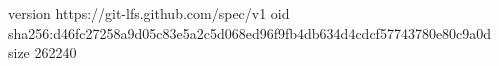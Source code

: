 version https://git-lfs.github.com/spec/v1
oid sha256:d46fc27258a9d05c83e5a2c5d068ed96f9fb4db634d4cdcf57743780e80c9a0d
size 262240
